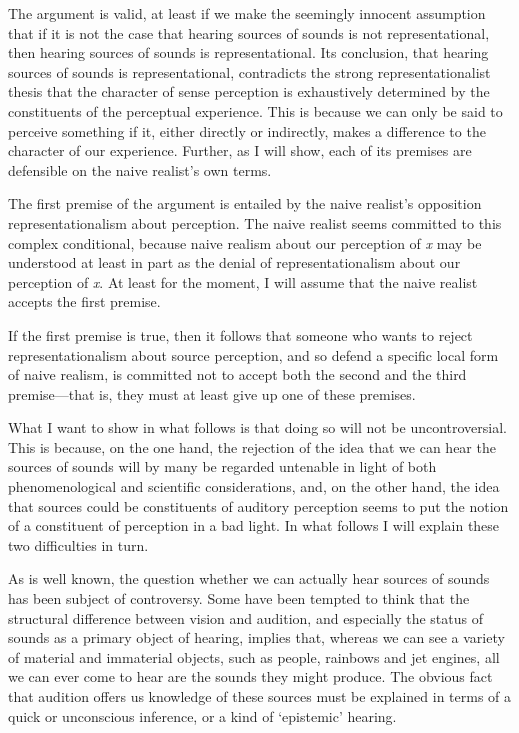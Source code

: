 \documentclass[sloppy, journal, git, bytitle, dodraft]{humapap}
\begin{document}
The argument is valid, at least if we make the seemingly innocent assumption that if it is not the case that hearing sources of sounds is not representational, then hearing sources of sounds is representational. Its conclusion, that hearing sources of sounds is  representational, contradicts the strong representationalist thesis that the character of sense perception is exhaustively determined by the constituents of the perceptual experience. This is because we can only be said to perceive something if it, either directly or indirectly, makes a difference to the character of our experience. Further, as I will show, each of its premises are defensible on the naive realist's own terms. 

The first premise of the argument is entailed by the naive realist's opposition representationalism about perception. The naive realist seems committed to this complex conditional, because naive realism about our perception of \emph{x} may be understood at least in part as the denial of representationalism about our perception of  \emph{x}.  At least for the moment, I will assume  that the naive realist accepts the first premise. 

If the first premise is true, then it follows that someone who wants to reject representationalism about source perception, and so defend a specific local form of naive realism, is committed not to accept both the second and the third premise---that is, they must at least give up one of these premises. 

What I want to show in what follows is that doing so will not be uncontroversial. This is because, on the one hand, the rejection of the idea that we can hear the sources of sounds will by many be regarded untenable in light of both phenomenological and scientific considerations, and, on the other hand, the idea that sources could be constituents of auditory perception seems to put the notion of a constituent of perception in a bad light.  In what follows I will explain these two difficulties in turn.

\sect As is well known, the question whether we can actually hear sources of sounds has been subject of  controversy. Some have been tempted to think that the structural difference between vision and audition, and especially the status of sounds as a primary object of hearing, implies that, whereas we can see a variety of material and immaterial objects, such as people, rainbows and jet engines, all we can ever come to hear are the sounds they might produce. The obvious fact that audition offers us knowledge of these sources must be explained in terms of a quick or unconscious inference, or a kind of `epistemic' hearing.  
\end{document}
